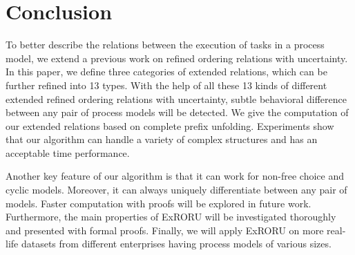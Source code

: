 \documentclass{llncs}
\begin{document}

\section{Conclusion}\label{sec:conclusion}
To better describe the relations between the execution of tasks in a process model, we extend a previous work on refined ordering relations with uncertainty. In this paper, we define three categories of extended relations, which can be further refined into 13 types. With the help of all these 13 kinds of different extended refined ordering relations with uncertainty, subtle behavioral difference between any pair of process models will be detected. We give the computation of our extended relations based on complete prefix unfolding. Experiments show that our algorithm can handle a variety of complex structures and has an acceptable time performance.

Another key feature of our algorithm is that it can work for non-free choice and cyclic models. Moreover, it can 
always uniquely differentiate between any pair of models. Faster computation with proofs will be explored in future work. Furthermore, the main properties of ExRORU will be investigated thoroughly and presented with formal proofs. Finally, we will apply ExRORU on more real-life datasets from different enterprises having process models of various sizes.




\end{document}
